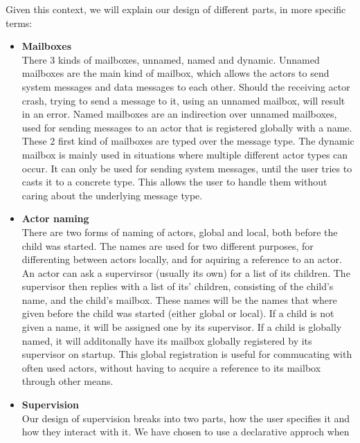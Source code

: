 \documentclass[a4paper]{article}
\begin{document}
\noindent
Given this context, we will explain our design of different parts, in more
specific terms:
\begin{itemize}
\item \textbf{Mailboxes}\\
  There 3 kinds of mailboxes, unnamed, named and dynamic. Unnamed mailboxes are
  the main kind of mailbox, which allows the actors to send system messages and
  data messages to each other. Should the receiving actor crash, trying to send
  a message to it, using an unnamed mailbox, will result in an error. Named
  mailboxes are an indirection over unnamed mailboxes, used for sending messages
  to an actor that is registered globally with a name. These 2 first kind of
  mailboxes are typed over the message type. The dynamic mailbox is mainly used
  in situations where multiple different actor types can occur. %
  It can only be used for sending system messages, until the user tries to casts
  it to a concrete type. This allows the user to handle them without caring
  about the underlying message type.
\item \textbf{Actor naming}\\
  There are two forms of naming of actors, global and local, both before the
  child was started. The names are used for two different purposes, for
  differenting between actors locally, and for aquiring a reference to an actor.
  An actor can ask a supervirsor (usually its own) for a list of its children.
  The supervisor then replies with a list of its' children, consisting of the
  child's name, and the child's mailbox. These names will be the names that
  where given before the child was started (either global or local). If a child
  is not given a name, it will be assigned one by its supervisor. If a child is
  globally named, it will additonally have its mailbox globally registered by
  its supervisor on startup. This global registration is useful for commucating
  with often used actors, without having to acquire a reference to its mailbox
  through other means.
\item \textbf{Supervision}\\
  Our design of supervision breaks into two parts, how the user specifies it and
  how they interact with it. We have chosen to use a declarative approch when

\end{itemize}
\end{document}
